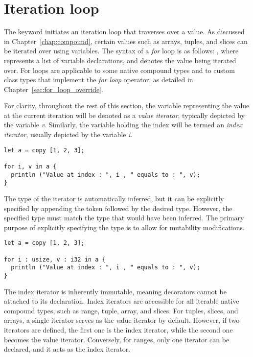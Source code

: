 \section{Iteration loop}%
\label{sec:for_loop}

The keyword  initiates an iteration loop that traverses over a value.
As discussed in Chapter~\ref{chap:compound}, certain values such as arrays,
tuples, and slices can be iterated over using variables. The syntax of a
\textit{for} loop is as follows: , where  represents a list of variable declarations, and  denotes the
value being iterated over. For loops are applicable to some native compound
types and to custom class types that implement the \textit{for loop} operator,
as detailed in Chapter~\ref{sec:for_loop_override}.

For clarity, throughout the rest of this section, the variable representing the
value at the current iteration will be denoted as a \textit{value iterator},
typically depicted by the variable \textit{v}. Similarly, the variable holding
the index will be termed an \textit{index iterator}, usually depicted by the
variable \textit{i}.

\begin{lstlisting}[style=coloredverbatim]
let a = copy [1, 2, 3];

for i, v in a {
  println ("Value at index : ", i , " equals to : ", v);
}
\end{lstlisting}

The type of the iterator is automatically inferred, but it can be explicitly
specified by appending the token \token{:} followed by the desired type.
However, the specified type must match the type that would have been inferred.
The primary purpose of explicitly specifying the type is to allow for mutability
modifications.

\begin{lstlisting}[style=coloredverbatim]
let a = copy [1, 2, 3];

for i : usize, v : i32 in a {
  println ("Value at index : ", i , " equals to : ", v);
}
\end{lstlisting}

The index iterator is inherently immutable, meaning decorators cannot be
attached to its declaration. Index iterators are accessible for all iterable
native compound types, such as range, tuple, array, and slices. For tuples,
slices, and arrays, a single iterator serves as the value iterator by default.
However, if two iterators are defined, the first one is the index iterator,
while the second one becomes the value iterator. Conversely, for ranges, only
one iterator can be declared, and it acts as the index iterator.

